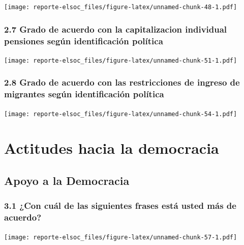 \documentclass[
  12pt,
  openany]{book}
\begin{document}
\texttt{[image: reporte-elsoc\_files/figure-latex/unnamed-chunk-48-1.pdf]}

\hypertarget{grado-de-acuerdo-con-la-capitalizacion-individual-pensiones-seguxfan-identificaciuxf3n-poluxedtica}{%
\subsection{2.7 Grado de acuerdo con la capitalizacion individual pensiones según identificación política}\label{grado-de-acuerdo-con-la-capitalizacion-individual-pensiones-seguxfan-identificaciuxf3n-poluxedtica}}

\texttt{[image: reporte-elsoc\_files/figure-latex/unnamed-chunk-51-1.pdf]}

\hypertarget{grado-de-acuerdo-con-las-restricciones-de-ingreso-de-migrantes-seguxfan-identificaciuxf3n-poluxedtica}{%
\subsection{2.8 Grado de acuerdo con las restricciones de ingreso de migrantes según identificación política}\label{grado-de-acuerdo-con-las-restricciones-de-ingreso-de-migrantes-seguxfan-identificaciuxf3n-poluxedtica}}

\texttt{[image: reporte-elsoc\_files/figure-latex/unnamed-chunk-54-1.pdf]}

\hypertarget{actitudes-hacia-la-democracia}{%
\chapter{Actitudes hacia la democracia}\label{actitudes-hacia-la-democracia}}

\hypertarget{apoyo-a-la-democracia}{%
\section{Apoyo a la Democracia}\label{apoyo-a-la-democracia}}

\hypertarget{con-cuuxe1l-de-las-siguientes-frases-estuxe1-usted-muxe1s-de-acuerdo}{%
\subsection{3.1 ¿Con cuál de las siguientes frases está usted más de acuerdo?}\label{con-cuuxe1l-de-las-siguientes-frases-estuxe1-usted-muxe1s-de-acuerdo}}

\texttt{[image: reporte-elsoc\_files/figure-latex/unnamed-chunk-57-1.pdf]}
\end{document}

